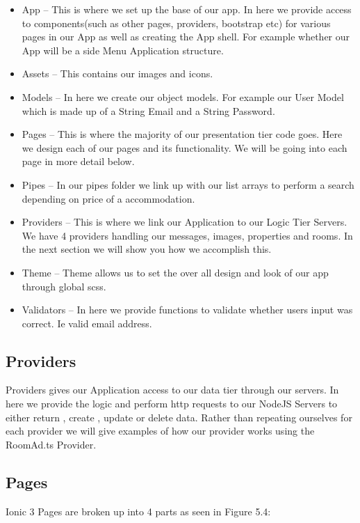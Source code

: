 \begin{itemize}
\item App – This is where we set up the base of our app. In here we provide access to components(such as other pages, providers, bootstrap etc) for various pages in our App as well as creating the App shell. For example whether our App will be a side Menu Application structure.
\item Assets – This contains our images and icons. 
\item Models – In here we create our object models. For example our User Model which is made up of a String Email and a String Password.
\item Pages – This is where the majority of our presentation tier code goes. Here we design each of our pages and its functionality. We will be going into each page in more detail below.
\item Pipes – In our pipes folder we link up with our list arrays to perform a search depending on price of a accommodation.
\item Providers – This is where we link our Application to our Logic Tier Servers. We have 4 providers handling our messages, images, properties and rooms. In the next section we will show you how we accomplish this.
\item Theme – Theme allows us to set the over all design and look of our app through global scss.
\item Validators – In here we provide functions to validate whether users input was correct. Ie valid email address.
\end{itemize}

\subsection{Providers}

Providers gives our Application access to our data tier through our servers. In here we provide the logic and perform http requests to our NodeJS Servers to either return , create , update or delete data. Rather than repeating ourselves for each provider we will give examples of how our provider works using the RoomAd.ts Provider.

\subsection{Pages}

Ionic 3 Pages are broken up into 4 parts as seen in Figure 5.4:\\

